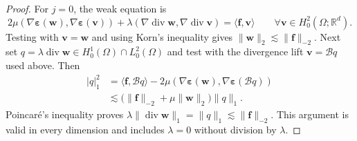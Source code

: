 \documentclass[10pt]{amsart}
\renewcommand{\div}{\operatorname{div}}
\numberwithin{equation}{section}
\begin{document}
\begin{proof}
For $j=0$, the weak equation is
\[
2\mu(\nabla\boldsymbol\varepsilon(\boldsymbol w),\nabla\boldsymbol\varepsilon(\boldsymbol v))
+\lambda(\nabla\div\boldsymbol w,\nabla\div\boldsymbol v)
=\langle\boldsymbol f,\boldsymbol v\rangle
\qquad\forall\boldsymbol v\in H_0^2(\Omega;\mathbb R^d).
\]
Testing with $\boldsymbol v=\boldsymbol w$ and using Korn's inequality gives $\|\boldsymbol w\|_2\lesssim\|\boldsymbol f\|_{-2}$. Next set $q=\lambda\div\boldsymbol w\in H_0^1(\Omega)\cap L_0^2(\Omega)$ and test with the divergence lift $\boldsymbol v=\mathcal Bq$ used above. Then
\[
\begin{aligned}
|q|_1^2
&=\langle\boldsymbol f,\mathcal Bq\rangle
-2\mu(\nabla\boldsymbol\varepsilon(\boldsymbol w),\nabla\boldsymbol\varepsilon(\mathcal Bq))\\
&\lesssim\big(\|\boldsymbol f\|_{-2}+\mu\|\boldsymbol w\|_2\big)\|q\|_1.
\end{aligned}
\]
Poincar\'e's inequality proves $\lambda\|\div\boldsymbol w\|_1=\|q\|_1\lesssim\|\boldsymbol f\|_{-2}$. This argument is valid in every dimension and includes $\lambda=0$ without division by $\lambda$.


\end{proof}
\end{document}
